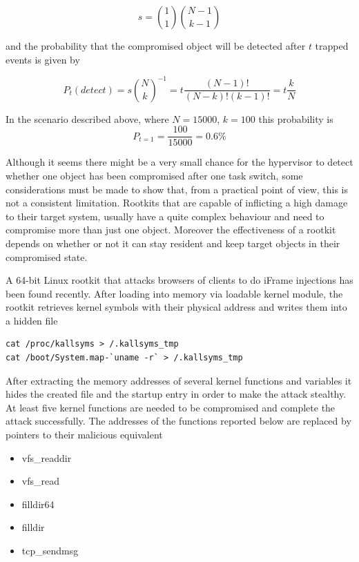 $$ s = \binom{1}{1} \binom{N-1}{k-1} $$ 

and the probability that the compromised object will be detected after $t$ trapped events is given by

$$P_t(detect) = s {\binom{N}{k}}^{-1}= t \frac{(N-1)!}{(N-k)!(k-1)!} = t \frac{k}{N}$$


In the scenario described above, where $N=15000$, $k=100$ this probability is
$$ P_{t=1} = \frac{100}{15000}=0.6\% $$


Although it seems there might be a very small chance for the hypervisor to detect whether one object has been compromised after one task switch, some considerations must be made to show that, from a practical point of view, this is not a consistent limitation.
Rootkits that are capable of inflicting a high damage to their target system, usually have a quite complex behaviour and need to compromise more than just one object. Moreover the effectiveness of a rootkit depends on whether or not it can stay resident and keep target objects in their compromised state.

 
A 64-bit Linux rootkit\cite{rootkit64} that attacks browsers of clients to do iFrame injections has been found recently. After loading into memory via loadable kernel module, the rootkit retrieves kernel symbols with their physical address and writes them into a hidden file

\begin{verbatim}
cat /proc/kallsyms > /.kallsyms_tmp 
cat /boot/System.map-`uname -r` > /.kallsyms_tmp
\end{verbatim}

After extracting the memory addresses of several kernel functions and variables it hides the created file and the startup entry in order to make the attack stealthy. At least five kernel functions are needed to be compromised and complete the attack successfully. The addresses of the functions reported below are replaced by pointers to their malicious equivalent \cite{rootkit64,rootkit64anal}

\begin{itemize}
\item vfs\_readdir 
\item vfs\_read 
\item filldir64 
\item filldir
\item tcp\_sendmsg
\end{itemize}

